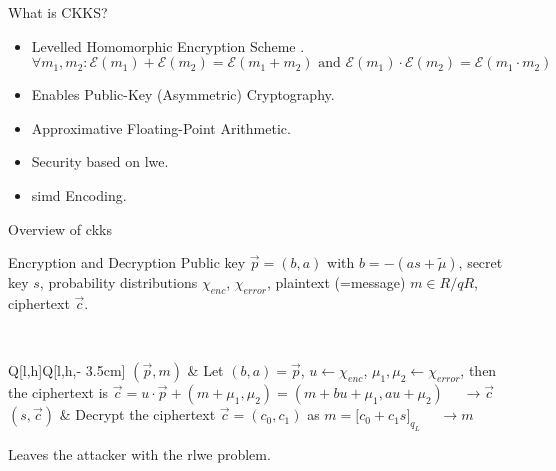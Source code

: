\begin{frame}{What is CKKS?}
  \begin{itemize}
    \item Levelled Homomorphic Encryption Scheme \cite{2017-ckks-original}.
          $$\forall m_1, m_2: \mathcal{E}(m_1) + \mathcal{E}(m_2) = \mathcal{E}(m_1 + m_2) \text{ and } \mathcal{E}(m_1) \cdot \mathcal{E}(m_2) = \mathcal{E}(m_1 \cdot m_2)$$
    \item Enables Public-Key (Asymmetric) Cryptography.
    \item Approximative Floating-Point Arithmetic.
    \item Security based on \glsdesc{lwe}.
    \item \gls{simd} Encoding.
  \end{itemize}
\end{frame}

\begin{frame}{Overview of \gls{ckks}}
  \begin{figure}[H]
    \centering
    \label{fig:ckks-overview}
  \end{figure}
\end{frame}

\begin{frame}{Encryption and Decryption}
  Public key $\vec{p} = (b, a)$ with $b = -(as + \tilde{\mu})$, secret key $s$, probability distributions $\chi_{enc}$, $\chi_{error}$, plaintext (=message) $m \in R/qR$, ciphertext $\vec{c}$.

   \\
  \begin{tblr}{Q[l,h]Q[l,h,\textwidth - 3.5cm]}
    $(\vec{p}, m)$ & {
        Let $(b,a) = \vec{p}$, $u \leftarrow \chi_{enc}$, $\mu_1, \mu_2 \leftarrow \chi_{error}$,
        then the ciphertext is $\vec{c} = u \cdot \vec{p} + (m + \mu_1, \mu_2) = (m + bu + \mu_1, au + \mu_2)$
        $\quad\rightarrow \vec{c}$} \\
    $(s, \vec{c})$ & {
        Decrypt the ciphertext $\vec{c} = (c_0, c_1)$ as $m = \lbrack c_0 + c_1 s\rbrack_{q_L}$
        $\quad\rightarrow m$} \\
  \end{tblr}

  Leaves the attacker with the \gls{rlwe} problem.
\end{frame}

